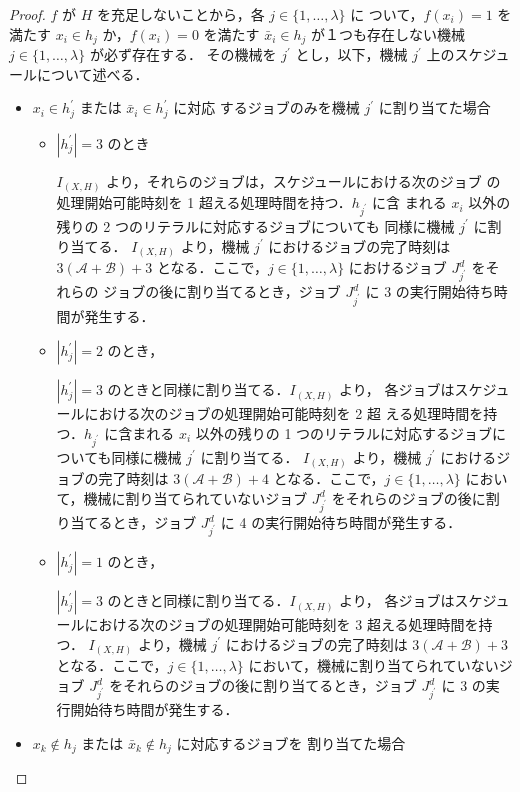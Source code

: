 \documentclass[12pt]{optlab-bachelor}
\begin{document}
  \begin{proof}
    $f$ が $H$ を充足しないことから，各 $j \in \{1, \ldots, \lambda \}$ に
    ついて，$f(x_i) = 1$ を満たす $x_i \in h_j$ か，$f(x_i) = 0$ を満たす
    $\bar x_i \in h_j$ が１つも存在しない機械 $j \in \{1,\ldots, \lambda\}$ が必ず存在する．
    その機械を $j^{\prime}$ とし，以下，機械 $j^{\prime}$ 上のスケジュールについて述べる．
    \begin{itemize}
      \item $x_i \in h_j^{\prime}$ または $\bar x_i \in h_j^{\prime}$ に対応
      するジョブのみを機械 $j^{\prime}$ に割り当てた場合
      \begin{itemize}
        \item $|h_j^{\prime}| = 3$ のとき

        $I_{(X,H)}$ より，それらのジョブは，スケジュールにおける次のジョブ
        の処理開始可能時刻を 1 超える処理時間を持つ．$h_{j^{\prime}}$ に含
        まれる $x_i$ 以外の残りの 2 つのリテラルに対応するジョブについても
        同様に機械 $j^{\prime}$ に割り当てる．
        $I_{(X,H)}$ より，機械 $j^{\prime}$ におけるジョブの完了時刻は
        $3(\mathcal{A} + \mathcal{B}) + 3$ となる．ここで，$j \in
        \{1,\ldots,\lambda\}$ におけるジョブ $J^d_{j^{\prime}}$ をそれらの
        ジョブの後に割り当てるとき，ジョブ $J^d_{j^{\prime}}$ に 3 の実行開始待ち時間が発生する．
        \item $|h_j^{\prime}| = 2$ のとき，

        $|h_j^{\prime}| = 3$ のときと同様に割り当てる．$I_{(X,H)}$ より，
        各ジョブはスケジュールにおける次のジョブの処理開始可能時刻を 2 超
        える処理時間を持つ．$h_{j^{\prime}}$ に含まれる $x_i$ 以外の残りの
        1 つのリテラルに対応するジョブについても同様に機械 $j^{\prime}$ に割り当てる．
        $I_{(X,H)}$ より，機械 $j^{\prime}$ におけるジョブの完了時刻は
        $3(\mathcal{A} + \mathcal{B}) + 4$ となる．ここで，$j \in
        \{1,\ldots,\lambda\}$ において，機械に割り当てられていないジョブ
        $J^d_{j^{\prime}}$ をそれらのジョブの後に割り当てるとき，ジョブ
        $J^d_{j^{\prime}}$ に 4 の実行開始待ち時間が発生する．
        \item  $|h_j^{\prime}| = 1$ のとき，

        $|h_j^{\prime}| = 3$ のときと同様に割り当てる．$I_{(X,H)}$ より，
        各ジョブはスケジュールにおける次のジョブの処理開始可能時刻を 3 超える処理時間を持つ．
        $I_{(X,H)}$ より，機械 $j^{\prime}$ におけるジョブの完了時刻は
        $3(\mathcal{A} + \mathcal{B}) + 3$ となる．ここで，$j \in
        \{1,\ldots,\lambda\}$ において，機械に割り当てられていないジョブ
        $J^d_{j^{\prime}}$ をそれらのジョブの後に割り当てるとき，ジョブ
        $J^d_{j^{\prime}}$ に 3 の実行開始待ち時間が発生する．
      \end{itemize}
      \item $x_k \notin h_j$ または $\bar x_k \notin h_j$ に対応するジョブを
      割り当てた場合


\end{itemize}
\end{proof}
\end{document}
